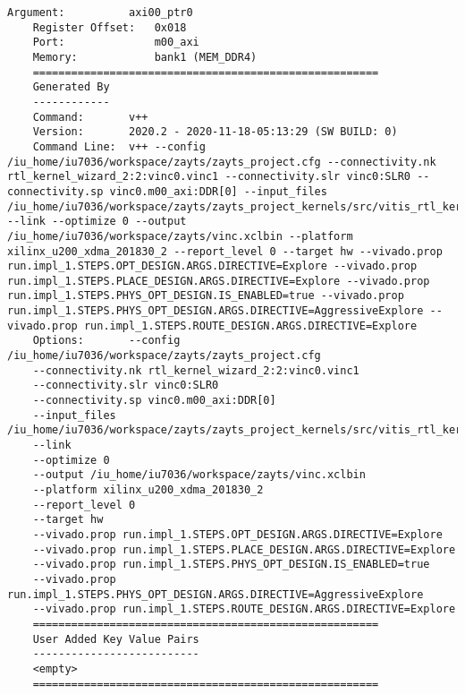 \begin{lstlisting}[caption=Содержимое файла vinc.xclbin.info, label={infof}]
	Argument:          axi00_ptr0
	Register Offset:   0x018
	Port:              m00_axi
	Memory:            bank1 (MEM_DDR4)
	======================================================
	Generated By
	------------
	Command:       v++
	Version:       2020.2 - 2020-11-18-05:13:29 (SW BUILD: 0)
	Command Line:  v++ --config /iu_home/iu7036/workspace/zayts/zayts_project.cfg --connectivity.nk rtl_kernel_wizard_2:2:vinc0.vinc1 --connectivity.slr vinc0:SLR0 --connectivity.sp vinc0.m00_axi:DDR[0] --input_files /iu_home/iu7036/workspace/zayts/zayts_project_kernels/src/vitis_rtl_kernel/rtl_kernel_wizard_2/rtl_kernel_wizard_2.xo --link --optimize 0 --output /iu_home/iu7036/workspace/zayts/vinc.xclbin --platform xilinx_u200_xdma_201830_2 --report_level 0 --target hw --vivado.prop run.impl_1.STEPS.OPT_DESIGN.ARGS.DIRECTIVE=Explore --vivado.prop run.impl_1.STEPS.PLACE_DESIGN.ARGS.DIRECTIVE=Explore --vivado.prop run.impl_1.STEPS.PHYS_OPT_DESIGN.IS_ENABLED=true --vivado.prop run.impl_1.STEPS.PHYS_OPT_DESIGN.ARGS.DIRECTIVE=AggressiveExplore --vivado.prop run.impl_1.STEPS.ROUTE_DESIGN.ARGS.DIRECTIVE=Explore 
	Options:       --config /iu_home/iu7036/workspace/zayts/zayts_project.cfg
	--connectivity.nk rtl_kernel_wizard_2:2:vinc0.vinc1
	--connectivity.slr vinc0:SLR0
	--connectivity.sp vinc0.m00_axi:DDR[0]
	--input_files /iu_home/iu7036/workspace/zayts/zayts_project_kernels/src/vitis_rtl_kernel/rtl_kernel_wizard_2/rtl_kernel_wizard_2.xo
	--link
	--optimize 0
	--output /iu_home/iu7036/workspace/zayts/vinc.xclbin
	--platform xilinx_u200_xdma_201830_2
	--report_level 0
	--target hw
	--vivado.prop run.impl_1.STEPS.OPT_DESIGN.ARGS.DIRECTIVE=Explore
	--vivado.prop run.impl_1.STEPS.PLACE_DESIGN.ARGS.DIRECTIVE=Explore
	--vivado.prop run.impl_1.STEPS.PHYS_OPT_DESIGN.IS_ENABLED=true
	--vivado.prop run.impl_1.STEPS.PHYS_OPT_DESIGN.ARGS.DIRECTIVE=AggressiveExplore
	--vivado.prop run.impl_1.STEPS.ROUTE_DESIGN.ARGS.DIRECTIVE=Explore 
	======================================================
	User Added Key Value Pairs
	--------------------------
	<empty>
	======================================================
\end{lstlisting}


